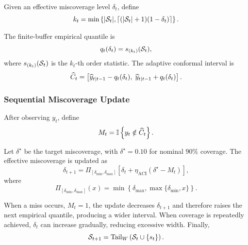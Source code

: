 \documentclass[review,number,sort&compress]{elsarticle}
\begin{document}
Given an effective miscoverage level $\delta_t$, define
\begin{equation}
    k_t
    =
    \min
    \left\{
    |\mathcal{S}_t|,
    \left\lceil
    (|\mathcal{S}_t|+1)(1-\delta_t)
    \right\rceil
    \right\}.
\end{equation}

The finite-buffer empirical quantile is
\begin{equation}
    q_t(\delta_t)
    =
    s_{(k_t)}(\mathcal{S}_t),
    \label{eq:aci_quantile}
\end{equation}
where $s_{(k_t)}(\mathcal{S}_t)$ is the $k_t$-th order statistic.
The adaptive conformal interval is
\begin{equation}
    \widehat{C}_t
    =
    \left[
    \widehat{y}_{t|t-1}-q_t(\delta_t),
    \;
    \widehat{y}_{t|t-1}+q_t(\delta_t)
    \right].
    \label{eq:aci_interval}
\end{equation}

\subsubsection{Sequential Miscoverage Update}

After observing $y_t$, define
\begin{equation}
    M_t
    =
    \mathbb{I}
    \left\{
    y_t\notin\widehat{C}_t
    \right\}.
    \label{eq:miss_indicator}
\end{equation}

Let $\delta^\star$ be the target miscoverage, with
$\delta^\star=0.10$ for nominal $90\%$ coverage. The effective miscoverage is
updated as
\begin{equation}
    \delta_{t+1}
    =
    \Pi_{[\delta_{\min},\delta_{\max}]}
    \left[
        \delta_t
        +
        \eta_{\mathrm{ACI}}
        \left(
        \delta^\star-M_t
        \right)
    \right],
    \label{eq:aci_update}
\end{equation}
where
\begin{equation}
    \Pi_{[\delta_{\min},\delta_{\max}]}(x)
    =
    \min
    \left\{
    \delta_{\max},
    \max\{\delta_{\min},x\}
    \right\}.
\end{equation}

When a miss occurs, $M_t=1$, the update decreases $\delta_{t+1}$ and therefore
raises the next empirical quantile, producing a wider interval. When coverage
is repeatedly achieved, $\delta_t$ can increase gradually, reducing excessive
width. Finally,
\begin{equation}
    \mathcal{S}_{t+1}
    =
    \operatorname{Tail}_{W}
    \left(
    \mathcal{S}_t\cup\{s_t\}
    \right).
    \label{eq:aci_buffer_update}
\end{equation}
\end{document}
